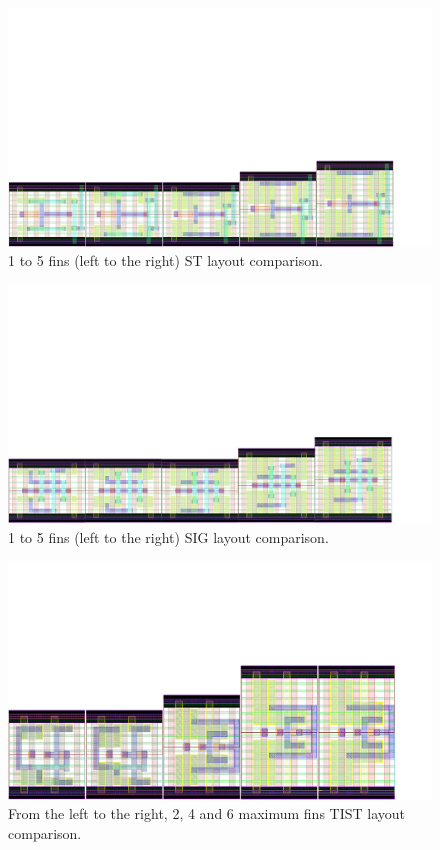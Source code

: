 \documentclass[pgmicro,mestrado,english]{iiufrgs}
\begin{document}
\begin{figure}[H]
\centering
\includegraphics[width=\textwidth, trim={0cm 0cm 3cm 12cm},clip]{STComp.pdf}
\caption{1 to 5 fins (left to the right) ST layout comparison.}
\label{fig:stComp}
\end{figure}

\begin{figure}[H]
\centering
\includegraphics[width=\textwidth, trim={0cm 0cm 3cm 12cm},clip]{SIGComp.pdf}
\caption{1 to 5 fins (left to the right) SIG layout comparison.}
\label{fig:sigComp}
\end{figure}

\begin{figure}[H]
\centering
\includegraphics[width=\textwidth, trim={0cm 0cm 3cm 8cm},clip]{TISTComp.pdf}
\caption{From the left to the right, 2, 4 and 6 maximum fins TIST layout comparison.}
\label{fig:tistComp}
\end{figure}
\end{document}
